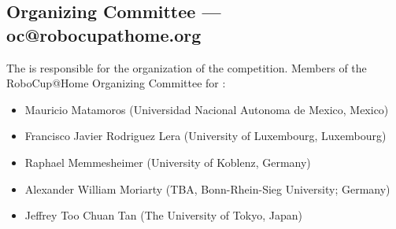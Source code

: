 \subsection{Organizing Committee --- oc@robocupathome.org}
\label{sec:oc}
The  is responsible for the organization of the competition. Members of the RoboCup@Home Organizing Committee for \YEAR:

\begin{itemize}
  \item Mauricio Matamoros (Universidad Nacional Autonoma de Mexico, Mexico)
  \item Francisco Javier Rodriguez Lera (University of Luxembourg, Luxembourg)
  \item Raphael Memmesheimer (University of Koblenz, Germany)
  \item Alexander William Moriarty (TBA, Bonn-Rhein-Sieg University; Germany)
  \item Jeffrey Too Chuan Tan (The University of Tokyo, Japan)
\end{itemize}

